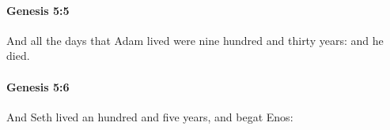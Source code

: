 		\paragraph{Genesis 5:5} %
			\label{GENESIS-5-5}

			And all the days that Adam lived were nine hundred and thirty years: and he died.


		\paragraph{Genesis 5:6} %
			\label{GENESIS-5-6}

			And Seth lived an hundred and five years, and begat Enos:



